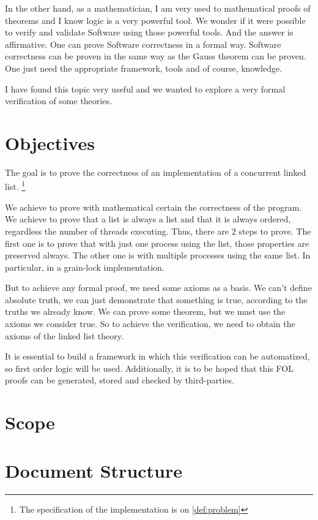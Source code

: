 In the other hand, as a mathematician, I am very used to mathematical proofs of theorems and I know logic is a very powerful tool.
%
We wonder if it were possible to verify and validate Software using those powerful tools.
%
And the answer is affirmative.
%
One can prove Software correctness in a formal way.
% 
Software correctness can be proven in the same way as the Gauss theorem can be proven.
%
One just need the appropriate framework, tools and of course, knowledge.


I have found this topic very useful and we wanted to explore a very formal verification of some theories.


\section{Objectives}

The goal is to prove the correctness of an implementation of a concurrent linked list. \footnote{The specification of the implementation is on \ref{def:problem}}

We achieve to prove with mathematical certain the correctness of the program. 
%
We achieve to prove that a list is always a list and that it is always ordered, regardless the number of threads executing.
%
Thus, there are 2 steps to prove. 
%
The first one is to prove that with just one process using the list, those properties are preserved always. 
%
The other one is with multiple processes using the same list. 
%
In particular, in a grain-lock implementation.

But to achieve any formal proof, we need some axioms as a basis.
%
We can't define absolute truth, we can just demonstrate that something is true, according to the truths we already know. 
%
We can prove some theorem, but we must use the axioms we consider true. 
%
So to achieve the verification, we need to obtain the axioms of the linked list theory.

It is essential to build a framework in which this verification can be automatized, so first order logic will be used. 
%
Additionally, it is to be hoped that this \gls{FOL} proofs can be generated, stored and checked by third-parties.


\section{Scope}

\label{def:leap}



\section{Document Structure}

